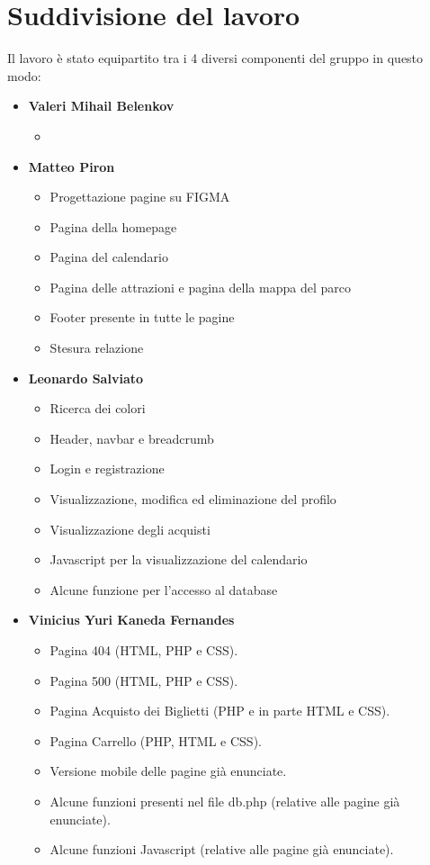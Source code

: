 \section{Suddivisione del lavoro}
Il lavoro è stato equipartito tra i 4 diversi componenti del gruppo in questo modo:

\begin{itemize}
    \item \textbf{Valeri Mihail Belenkov}
        \begin{itemize}
            \item 
        \end{itemize}
    \item \textbf{Matteo Piron}
        \begin{itemize}
            \item Progettazione pagine su FIGMA
            \item Pagina della homepage
            \item Pagina del calendario
            \item Pagina delle attrazioni e pagina della mappa del parco
            \item Footer presente in tutte le pagine
            \item Stesura relazione
        \end{itemize}
    \item \textbf{Leonardo Salviato}
        \begin{itemize}
            \item Ricerca dei colori
            \item Header, navbar e breadcrumb
            \item Login e registrazione
            \item Visualizzazione, modifica ed eliminazione del profilo
            \item Visualizzazione degli acquisti
            \item Javascript per la visualizzazione del calendario
            \item Alcune funzione per l'accesso al database
        \end{itemize}
    \item \textbf{Vinicius Yuri Kaneda Fernandes}
        \begin{itemize}
            \item Pagina 404 (HTML, PHP e CSS).
            \item Pagina 500 (HTML, PHP e CSS).
            \item Pagina Acquisto dei Biglietti (PHP e in parte HTML e CSS).
            \item Pagina Carrello (PHP, HTML e CSS).
            \item Versione mobile delle pagine già enunciate.
            \item Alcune funzioni presenti nel file db.php (relative alle pagine già enunciate).
            \item Alcune funzioni Javascript (relative alle pagine già enunciate).
        \end{itemize}
\end{itemize}